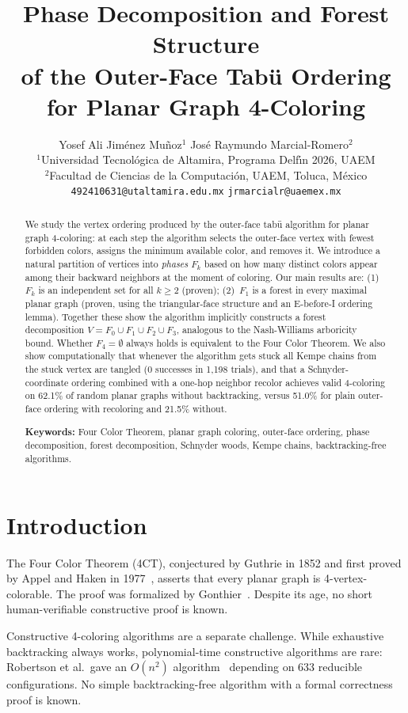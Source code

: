 \documentclass[11pt,twocolumn]{article}
\title{\textbf{Phase Decomposition and Forest Structure\\
of the Outer-Face Tab\"{u} Ordering\\
for Planar Graph 4-Coloring}}
\author{
  Yosef Ali Jim\'{e}nez Mu\~{n}oz$^{1}$
  \quad
  Jos\'{e} Raymundo Marcial-Romero$^{2}$
  \\[4pt]
  {\small $^1$Universidad Tecnol\'{o}gica de Altamira, Programa Delf\'{\i}n 2026, UAEM}\\
  {\small $^2$Facultad de Ciencias de la Computaci\'{o}n, UAEM, Toluca, M\'{e}xico}\\
  {\small \texttt{492410631@utaltamira.edu.mx} \quad \texttt{jrmarcialr@uaemex.mx}}
}
\date{}
\begin{document}
\maketitle

\begin{abstract}
We study the vertex ordering produced by the outer-face tab\"{u} algorithm for
planar graph 4-coloring: at each step the algorithm selects the outer-face vertex
with fewest forbidden colors, assigns the minimum available color, and removes
it. We introduce a natural partition of vertices into \emph{phases} $F_k$ based
on how many distinct colors appear among their backward neighbors at the moment
of coloring. Our main results are: (1)~$F_k$ is an independent set for all
$k\geq 2$ (proven); (2)~$F_1$ is a forest in every maximal planar graph (proven,
using the triangular-face structure and an E-before-I ordering lemma). Together
these show the algorithm implicitly constructs a forest decomposition
$V = F_0\cup F_1\cup F_2\cup F_3$, analogous to the Nash-Williams arboricity
bound. Whether $F_4=\emptyset$ always holds is equivalent to the Four Color
Theorem. We also show computationally that whenever the algorithm gets stuck all
Kempe chains from the stuck vertex are tangled (0 successes in 1{,}198 trials),
and that a Schnyder-coordinate ordering combined with a one-hop neighbor recolor
achieves valid 4-coloring on 62.1\% of random planar graphs without
backtracking, versus 51.0\% for plain outer-face ordering with recoloring and
21.5\% without.

\medskip\noindent\textbf{Keywords:} Four Color Theorem, planar graph coloring,
outer-face ordering, phase decomposition, forest decomposition, Schnyder woods,
Kempe chains, backtracking-free algorithms.
\end{abstract}

\section{Introduction}

The Four Color Theorem (4CT), conjectured by Guthrie in 1852 and first proved
by Appel and Haken in 1977~\cite{appelhaken1977a,appelhaken1977b}, asserts that
every planar graph is 4-vertex-colorable. The proof was formalized by
Gonthier~\cite{gonthier2008}. Despite its age, no short human-verifiable
constructive proof is known.

Constructive 4-coloring algorithms are a separate challenge. While exhaustive
backtracking always works, polynomial-time constructive algorithms are rare:
Robertson et al.\ gave an $O(n^2)$ algorithm~\cite{robertson1997} depending on
633 reducible configurations. No simple backtracking-free algorithm with a
formal correctness proof is known.
\end{document}
